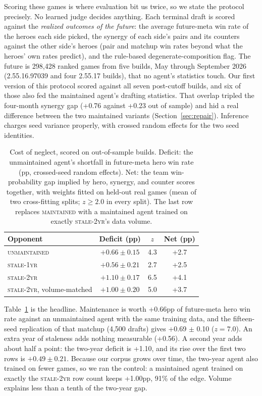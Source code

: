 \documentclass[journal]{IEEEtran}
\newcommand{\maintained}{\textsc{maintained}}          %
\newcommand{\stalefour}{\textsc{unmaintained}}
\newcommand{\staleone}{\textsc{stale-1yr}}
\newcommand{\staletwo}{\textsc{stale-2yr}}
\begin{document}
Scoring these games is where evaluation bit us twice, so we state the
protocol precisely. No learned judge decides anything. Each terminal
draft is scored against the \emph{realized outcomes of the future}: the
average future-meta win rate of the heroes each side picked, the
synergy of each side's pairs and its counters against the other side's
heroes (pair and matchup win rates beyond what the heroes' own rates
predict), and the rule-based degenerate-composition flag. The future is
298{,}428 ranked games from five builds, May through September 2026
(2.55.16.97039 and four 2.55.17 builds), that no agent's statistics
touch. Our first version of this protocol scored against all seven
post-cutoff builds, and six of those also fed the maintained agent's
drafting statistics. That overlap tripled the four-month synergy gap
(+0.76 against +0.23 out of sample) and hid a real difference between
the two maintained variants (Section~\ref{sec:repair}). Inference
charges seed variance properly, with crossed random effects for the two
seed identities.

\begin{table}[t]
\caption{Cost of neglect, scored on out-of-sample builds. Deficit: the
unmaintained agent's shortfall in future-meta hero win rate (pp,
crossed-seed random effects). Net: the team win-probability gap implied
by hero, synergy, and counter scores together, with weights fitted on
held-out real games (mean of two cross-fitting splits; $z \geq 2.0$ in
every split). The last row replaces \maintained{} with a maintained agent
trained on exactly \staletwo{}'s data volume.}
\label{tab:dose}
\centering
\footnotesize
\setlength{\tabcolsep}{4pt}
\begin{tabular}{lccc}
\toprule
Opponent & Deficit (pp) & $z$ & Net (pp) \\
\midrule
\stalefour{} & $+0.66 \pm 0.15$ & 4.3 & +2.7 \\
\staleone{} & $+0.56 \pm 0.21$ & 2.7 & +2.5 \\
\staletwo{} & $+1.10 \pm 0.17$ & 6.5 & +4.1 \\
\staletwo{}, volume-matched & $+1.00 \pm 0.20$ & 5.0 & +3.7 \\
\bottomrule
\end{tabular}
\end{table}

Table~\ref{tab:dose} is the headline. Maintenance is worth +0.66pp of
future-meta hero win rate against an unmaintained agent with the same
training data, and the fifteen-seed replication of that matchup (4{,}500
drafts) gives +0.69 $\pm$ 0.10 ($z = 7.0$). An extra year of staleness
adds nothing measurable (+0.56). A second year adds about half a point:
the two-year deficit is +1.10, and its rise over the first two rows is
$+0.49 \pm 0.21$. Because our corpus grows over time, the two-year agent
also trained on fewer games, so we ran the control: a maintained agent
trained on exactly the \staletwo{} row count keeps +1.00pp, 91\% of the
edge. Volume explains less than a tenth of the two-year gap.
\end{document}
